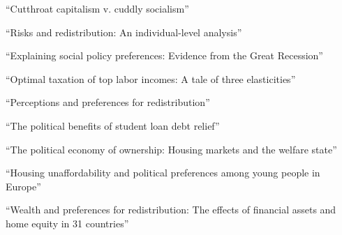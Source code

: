 \documentclass{article}
\begin{document}
\noindent \textbf{\cite{almaas2020cutthroat}} ``Cutthroat capitalism v. cuddly socialism''

\medskip \noindent \textbf{\cite{rehm2009risks}} ``Risks and redistribution: An individual-level analysis''

\medskip \noindent \textbf{\cite{margalit2013explaining}} ``Explaining social policy preferences: Evidence from the Great Recession''

\medskip \noindent \textbf{\cite{piketty2014optimal}} ``Optimal taxation of top labor incomes: A tale of three elasticities''

\medskip \noindent \textbf{\cite{stantcheva2021perceptions}} ``Perceptions and preferences for redistribution''

\medskip \noindent \textbf{\cite{sorelle2023political}} ``The political benefits of student loan debt relief''

\medskip \noindent \textbf{\cite{ansell2014political}} ``The political economy of ownership: Housing markets and the welfare state''

\medskip \noindent \textbf{\cite{furtado2025housing}} ``Housing unaffordability and political preferences among young people in Europe''

\medskip \noindent \textbf{\cite{steele2020wealth}} ``Wealth and preferences for redistribution: The effects of financial assets and home equity in 31 countries''


\end{document}
